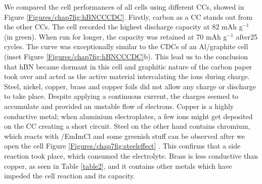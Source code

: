  We compared the cell performances of all cells using different CCs, showed in Figure \ref{Figures/chap7fig:hBNCCCDC}. Firstly, carbon as a CC stands out from the other CCs. The cell recorded the highest discharge capacity at 82 mAh g$^{-1}$ (in green). When run for longer, the capacity was retained at 70 mAh g$^{-1}$ after25 cycles. The curve was exceptionally similar to the CDCs of an Al/graphite cell (inset Figure \ref{Figures/chap7fig:hBNCCCDC}b). This lead us to the conclusion that hBN became dormant in this cell and graphitic nature of the carbon paper took over and acted as the active material intercalating the  ions during charge. Steel, nickel, copper, brass and copper foils did not allow any charge or discharge to take place. Despite applying a continuous current, the charges seemed to accumulate and provided an unstable flow of electrons. Copper is a highly conductive metal; when aluminium electroplates, a few ions might get deposited on the CC creating a short circuit. Steel on the other hand contains chromium, which reacts with /EmImCl and some greenish stuff can be observed after we open the cell Figure \ref{Figures/chap7fig:steeleffect} \cite{reed_roles_2013}. This confirms that a side reaction took place, which consumed the electrolyte. Brass is less conductive than copper, as seen in Table \ref{table2}, and it contains other metals which have impeded the cell reaction and its capacity.   
